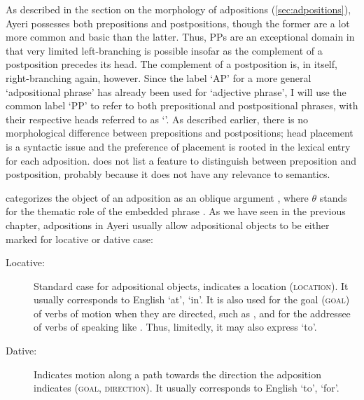 As described in the section on the morphology of adpositions
(\autoref{sec:adpositions}), Ayeri possesses both prepositions and
postpositions, though the former are a lot more common and basic than the
latter. Thus, PPs are an exceptional domain in that very limited left-branching
is possible insofar as the complement of a postposition precedes its head. The
complement of a postposition is, in itself, right-branching again, however.
Since the label `AP' for a more general `adpositional phrase' has already been
used for `adjective phrase', I will use the common label `PP' to refer to both
prepositional and postpositional phrases, with their respective heads referred
to as `'. As described earlier, there is no morphological difference
between prepositions and postpositions; head placement is a syntactic issue and
the preference of placement is rooted in the lexical entry for each adposition.
\citet{pargram} does not list a feature to distinguish between preposition and
postposition, probably because it does not have any relevance to semantics.

\Lfg{} categorizes the object of an adposition as an oblique argument 
\Oblique{}, where $\theta$ stands for the thematic role of the embedded phrase
\citep[9--10] {dalrymple2001}. As we have seen in the previous chapter,
adpositions in Ayeri usually allow adpositional objects to be either marked for
locative or dative case:

\begin{description}
	\item[Locative:] Standard case for adpositional objects, indicates a
	location (\textsc{location}). It usually corresponds to English `at', `in'.
	It is also used for the goal (\textsc{goal}) of verbs of motion when they
	are directed, such as , and for the addressee of verbs
	of speaking like . Thus, limitedly, it may also
	express `to'.

	\item[Dative:] Indicates motion along a path towards the direction the
	adposition indicates (\textsc{goal}, \textsc{direction}). It usually
	corresponds to English `to', `for'.
\end{description}

